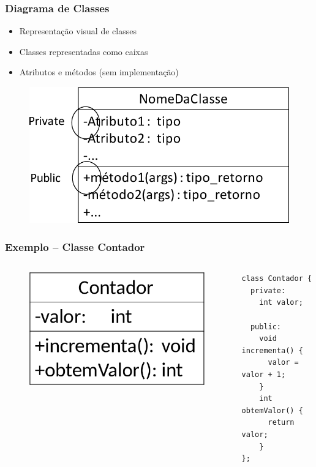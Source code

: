 \documentclass[aspectratio=169]{beamer}
\begin{document}
\begin{frame}\frametitle{Diagrama de Classes}
\begin{itemize}
	\item  Representação visual de classes
	\item  Classes representadas como caixas
	\item  Atributos e métodos (sem implementação)
\end{itemize}
\begin{figure}[h]
	\centering
	\includegraphics[height=0.45\paperheight]{pucrs-ec-poo-unidade_04-classes_e_objetos-laminas-uml1.png}
\end{figure}
\end{frame}

\begin{frame}[fragile]\frametitle{Exemplo -- Classe Contador}
\begin{columns}[T]
\begin{column}{0.5\linewidth}
\begin{figure}[h]
	\centering
	\includegraphics[height=0.3\paperheight]{pucrs-ec-poo-unidade_04-classes_e_objetos-laminas-uml2.png}
\end{figure}
\end{column}
\begin{column}{0.5\linewidth}
\begin{lstlisting}
class Contador {
  private:
    int valor;

  public:
    void incrementa() {
      valor = valor + 1;
    }
    int obtemValor() {
      return valor;
    }
};
\end{lstlisting}
\end{column}
\end{columns}
\end{frame}
\end{document}
